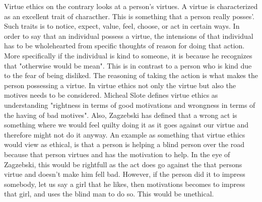 Virtue ethics on the contrary looks at a person's virtues. A virtue is characterized as an excellent trait of characther. This is something that a person really posses'. Such traits is to notice, expect, value, feel, choose, or act in certain ways. In order to say that an individual possess a virtue, the intensions of that individual has to be wholehearted from specific thoughts of reason for doing that action. More specifically if the individual is kind to someone, it is because he recognizes that "otherwise would be mean". This is in contrast to a person who is kind due to the fear of being disliked. The reasoning of taking the action is what makes the person possessing a virtue. 
In virtue ethics not only the virtue but also the motives needs to be considered. Micheal Slote defines virtue ethics as understanding "rightness in terms of good motivations and wrongness in terms of the having of bad motives". Also, Zagzebski has defined that a wrong act is something where we would feel quilty doing it as it goes against our virtue and therefore might not do it anyway. 
An example as something that virtue ethics would view as ethical, is that a person is helping a blind person over the road because that person virtues and has the motivation to help. In the eye of Zagzebski, this would be rightfull as the act does go against the that persons virtue and doesn't make him fell bad. However, if the person did it to impress somebody, let us say a girl that he likes, then motivations becomes to impress that girl, and uses the blind man to do so. This would be unethical. 
